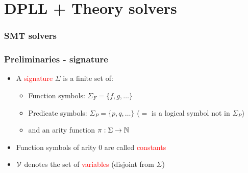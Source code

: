 \documentclass[smaller]{beamer}
\def\cV{{\cal V}}
\newcommand{\red}[1]{\textcolor{red}{#1}}
\begin{document}
\section{DPLL + Theory solvers}

\begin{frame}
\frametitle{SMT solvers}
\tableofcontents[currentsection]
\end{frame}



\begin{frame}
\frametitle{Preliminaries - signature}
\begin{itemize}
\setlength\itemsep{2mm}
\item A \red{signature} $\Sigma$ is a finite set of:
\vspace{2mm}
\begin{itemize}
\setlength\itemsep{2mm}
	\item Function symbols: $\Sigma_F=\{f,g,\ldots\}$
	\item Predicate symbols: $\Sigma_P=\{p,q,\ldots\}$ ($=$ is a logical symbol not in $\Sigma_P$)
	\item and an arity function $\pi:\Sigma\rightarrow{\mathbb{N}}$
\end{itemize}
\item Function symbols of arity 0 are called \red{constants}
\item $\cV$ denotes the set of \red{variables} (disjoint from $\Sigma$)
\end{itemize}
\end{frame}
\end{document}
